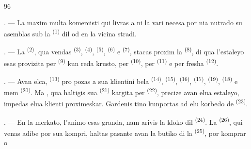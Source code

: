 %

\begin{VUpage}[98]{96}
\VUsaut{4.0mm}
\VUsaut{3.0mm}

\VUsaut{3.0mm}

. --- La maxim multa komercisti qui livras\nl
a ni la vari necesa por nia nutrado su asemblas\nl
sub la  \textsuperscript{(1)} dil  od en la\nl
vicina stradi.

. --- La  \textsuperscript{(2)}, qua vendas\nl
{} \textsuperscript{(3)},  \textsuperscript{(4)},  \textsuperscript{(5)}, \nl
{} \textsuperscript{(6)} e  \textsuperscript{(7)}, stacas proxim la \nl
{} \textsuperscript{(8)}, di qua l'estaleyo esas\nl
provizita per  \textsuperscript{(9)} kun reda\nl
krusto, per  \textsuperscript{(10)}, per\nl
{} \textsuperscript{(11)} e per fresha  \textsuperscript{(12)}.

. --- Avan elca,  \textsuperscript{(13)} pro\cc
pozas a sua klientini bela  \textsuperscript{(14)}, \nl
{} \textsuperscript{(15)},  \textsuperscript{(16)},  \textsuperscript{(17)}, \cc
{} \textsuperscript{(19)},  \textsuperscript{(18)} e mem  \textsuperscript{(20)}. Ma \cc
{}, qua haltigis sua  \textsuperscript{(21)} kargita\nl
per  \textsuperscript{(22)}, precize avan elua estaleyo,\nl
impedas elua klienti proximeskar. Gardenis\cc
tino kunportas ad elu korbedo de  \textsuperscript{(23)}.

\VUsaut{4.0mm}
\VUsaut{3.0mm}

. --- En la merkato, l'animo esas granda,\nl
nam arivis la kloko dil  \textsuperscript{(24)}. La\nl
{} \textsuperscript{(26)}, qui venas adibe por sua\nl
kompri, haltas pasante avan la butiko di la\nl
{} \textsuperscript{(25)}, por komprar \nl
o 
\end{VUpage}

